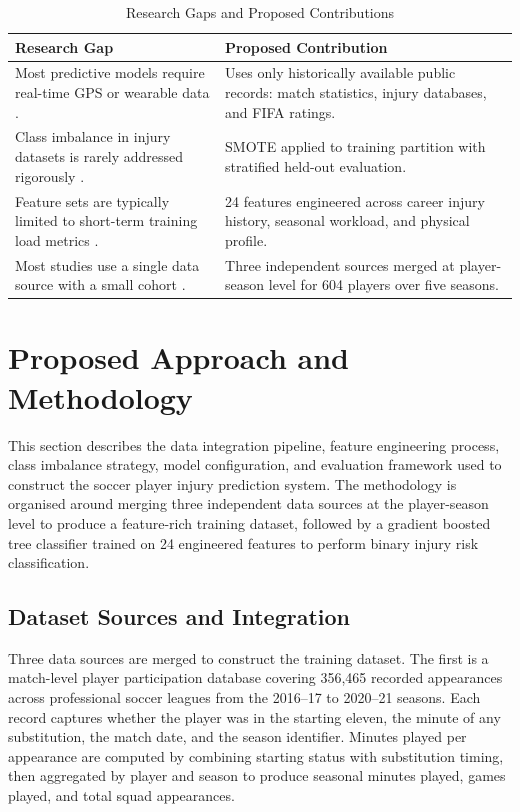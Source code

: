 \documentclass[conference]{IEEEtran}
\begin{document}
\begin{table}[ht]
\centering
\caption{Research Gaps and Proposed Contributions}
\label{tab:gap}
\renewcommand{\arraystretch}{1.15}
\begin{tabular}{|p{3cm}|p{3.8cm}|}
\hline
\textbf{Research Gap} & \textbf{Proposed Contribution} \\
\hline
Most predictive models require real-time GPS or wearable data \cite{rossi2018effective, akenhead2016training}. &
Uses only historically available public records: match statistics, injury databases, and FIFA ratings. \\
\hline
Class imbalance in injury datasets is rarely addressed rigorously \cite{claudino2019current}. &
SMOTE \cite{chawla2002smote} applied to training partition with stratified held-out evaluation. \\
\hline
Feature sets are typically limited to short-term training load metrics \cite{rommers2020machine}. &
24 features engineered across career injury history, seasonal workload, and physical profile. \\
\hline
Most studies use a single data source with a small cohort \cite{claudino2019current}. &
Three independent sources merged at player-season level for 604 players over five seasons. \\
\hline
\end{tabular}
\end{table}

\section{Proposed Approach and Methodology}

This section describes the data integration pipeline, feature engineering process, class imbalance strategy, model configuration, and evaluation framework used to construct the soccer player injury prediction system. The methodology is organised around merging three independent data sources at the player-season level to produce a feature-rich training dataset, followed by a gradient boosted tree classifier trained on 24 engineered features to perform binary injury risk classification.

\subsection{Dataset Sources and Integration}

Three data sources are merged to construct the training dataset. The first is a match-level player participation database covering 356,465 recorded appearances across professional soccer leagues from the 2016--17 to 2020--21 seasons. Each record captures whether the player was in the starting eleven, the minute of any substitution, the match date, and the season identifier. Minutes played per appearance are computed by combining starting status with substitution timing, then aggregated by player and season to produce seasonal minutes played, games played, and total squad appearances.
\end{document}
